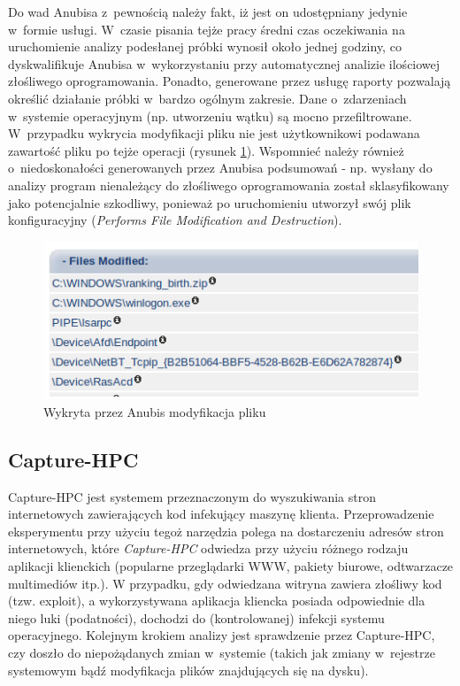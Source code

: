 \documentclass[a4paper,12pt,oneside]{article}
\begin{document}
	Do wad Anubisa z~pewnością należy fakt, iż jest on udostępniany jedynie w~formie usługi. W~czasie pisania tejże pracy średni czas oczekiwania na uruchomienie analizy podesłanej próbki wynosił około jednej godziny, co dyskwalifikuje Anubisa w~wykorzystaniu przy automatycznej analizie ilościowej złośliwego oprogramowania. Ponadto, generowane przez usługę raporty pozwalają określić działanie próbki w~bardzo ogólnym zakresie. Dane o~zdarzeniach w~systemie operacyjnym (np. utworzeniu wątku) są mocno przefiltrowane. W~przypadku wykrycia modyfikacji pliku nie jest użytkownikowi podawana zawartość pliku po tejże operacji (rysunek \ref{gfx-anubis-filemod}). Wspomnieć należy również o~niedoskonałości generowanych przez Anubisa podsumowań - np. wysłany do analizy program nienależący do złośliwego oprogramowania został sklasyfikowany jako potencjalnie szkodliwy, ponieważ po uruchomieniu utworzył swój plik konfiguracyjny (\textit{Performs File Modification and Destruction}).
	
	\begin{figure}[ht]
		\includegraphics[scale=0.6]{gfx/anubis-file-mod.png}
		\caption{Wykryta przez Anubis modyfikacja pliku}
		\label{gfx-anubis-filemod}
	\end{figure}
	
	\subsection{Capture-HPC}
	
	Capture-HPC \cite{www-hpc} jest systemem przeznaczonym do wyszukiwania stron internetowych zawierających kod infekujący maszynę klienta. Przeprowadzenie eksperymentu przy użyciu tegoż narzędzia polega na dostarczeniu adresów stron internetowych, które \textit{Capture-HPC} odwiedza przy użyciu różnego rodzaju aplikacji klienckich (popularne przeglądarki WWW, pakiety biurowe, odtwarzacze multimediów itp.). W przypadku, gdy odwiedzana witryna zawiera złośliwy kod (tzw. exploit), a wykorzystywana aplikacja kliencka posiada odpowiednie dla niego luki (podatności), dochodzi do (kontrolowanej) infekcji systemu operacyjnego. Kolejnym krokiem analizy jest sprawdzenie przez Capture-HPC, czy doszło do niepożądanych zmian w~systemie (takich jak zmiany w~rejestrze systemowym bądź modyfikacja plików znajdujących się na dysku). 
	
\end{document}
